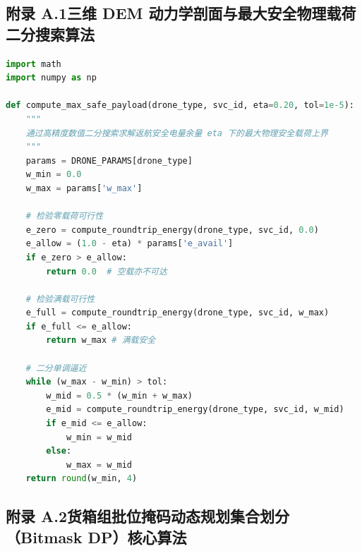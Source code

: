 \subsection*{附录 A.1\quad 三维 DEM 动力学剖面与最大安全物理载荷二分搜索算法}

\begin{lstlisting}[language=Python]
import math
import numpy as np

def compute_max_safe_payload(drone_type, svc_id, eta=0.20, tol=1e-5):
    """
    通过高精度数值二分搜索求解返航安全电量余量 eta 下的最大物理安全载荷上界
    """
    params = DRONE_PARAMS[drone_type]
    w_min = 0.0
    w_max = params['w_max']
    
    # 检验零载荷可行性
    e_zero = compute_roundtrip_energy(drone_type, svc_id, 0.0)
    e_allow = (1.0 - eta) * params['e_avail']
    if e_zero > e_allow:
        return 0.0  # 空载亦不可达
        
    # 检验满载可行性
    e_full = compute_roundtrip_energy(drone_type, svc_id, w_max)
    if e_full <= e_allow:
        return w_max # 满载安全
        
    # 二分单调逼近
    while (w_max - w_min) > tol:
        w_mid = 0.5 * (w_min + w_max)
        e_mid = compute_roundtrip_energy(drone_type, svc_id, w_mid)
        if e_mid <= e_allow:
            w_min = w_mid
        else:
            w_max = w_mid
    return round(w_min, 4)
\end{lstlisting}

\subsection*{附录 A.2\quad 货箱组批位掩码动态规划集合划分（Bitmask DP）核心算法}


